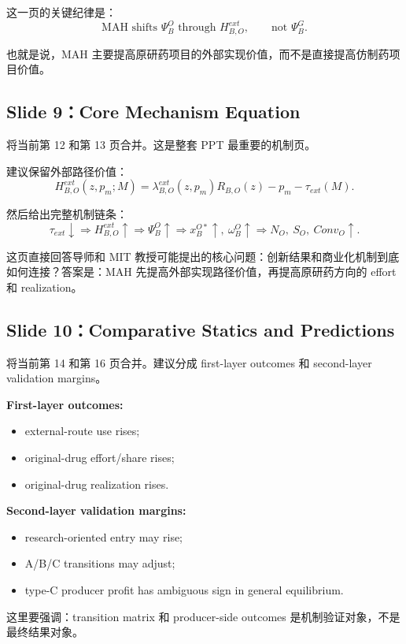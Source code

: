 \documentclass[12pt]{ctexart}
\begin{document}
这一页的关键纪律是：
\[
\text{MAH shifts }\Psi_B^O\text{ through }H^{ext}_{B,O},\qquad \text{not }\Psi_B^G.
\]

也就是说，MAH 主要提高原研药项目的外部实现价值，而不是直接提高仿制药项目价值。

\subsection{Slide 9：Core Mechanism Equation}

将当前第 12 和第 13 页合并。这是整套 PPT 最重要的机制页。

建议保留外部路径价值：
\[
H^{ext}_{B,O}(z,p_m;M)
=
\lambda^{ext}_{B,O}(z,p_m)R_{B,O}(z)-p_m-\tau_{ext}(M).
\]

然后给出完整机制链条：
\[
\tau_{ext}\downarrow
\Rightarrow
H^{ext}_{B,O}\uparrow
\Rightarrow
\Psi_B^O\uparrow
\Rightarrow
x_B^{O*}\uparrow,\ \omega_B^O\uparrow
\Rightarrow
N_O,\ S_O,\ Conv_O\uparrow.
\]

这页直接回答导师和 MIT 教授可能提出的核心问题：创新结果和商业化机制到底如何连接？答案是：MAH 先提高外部实现路径价值，再提高原研药方向的 effort 和 realization。

\subsection{Slide 10：Comparative Statics and Predictions}

将当前第 14 和第 16 页合并。建议分成 first-layer outcomes 和 second-layer validation margins。

\textbf{First-layer outcomes:}
\begin{itemize}
    \item external-route use rises;
    \item original-drug effort/share rises;
    \item original-drug realization rises.
\end{itemize}

\textbf{Second-layer validation margins:}
\begin{itemize}
    \item research-oriented entry may rise;
    \item A/B/C transitions may adjust;
    \item type-C producer profit has ambiguous sign in general equilibrium.
\end{itemize}

这里要强调：transition matrix 和 producer-side outcomes 是机制验证对象，不是最终结果对象。
\end{document}
